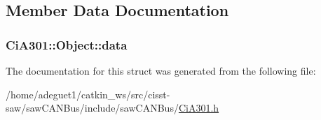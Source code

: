 \subsection{Member Data Documentation}
\hypertarget{struct_ci_a301_1_1_object_a73870d74c7ffaaf07515bf4a5d5330ea}{
\subsubsection[{data}]{ Ci\-A301\-::\-Object\-::data}}\label{struct_ci_a301_1_1_object_a73870d74c7ffaaf07515bf4a5d5330ea}


The documentation for this struct was generated from the following file\-:\begin{DoxyCompactItemize}
\item 
/home/adeguet1/catkin\-\_\-ws/src/cisst-\/saw/saw\-C\-A\-N\-Bus/include/saw\-C\-A\-N\-Bus/\hyperlink{_ci_a301_8h}{Ci\-A301.\-h}\end{DoxyCompactItemize}
